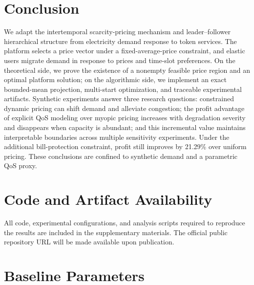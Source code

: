 \documentclass[11pt]{article}
\begin{document}
\section{Conclusion}

We adapt the intertemporal scarcity-pricing mechanism and leader--follower
hierarchical structure from electricity demand response to token services.
The platform selects a price vector under a fixed-average-price constraint,
and elastic users migrate demand in response to prices and time-slot
preferences. On the theoretical side, we prove the existence of a nonempty
feasible price region and an optimal platform solution; on the algorithmic
side, we implement an exact bounded-mean projection, multi-start
optimization, and traceable experimental artifacts. Synthetic experiments
answer three research questions: constrained dynamic pricing can shift
demand and alleviate congestion; the profit advantage of explicit QoS
modeling over myopic pricing increases with degradation severity and
disappears when capacity is abundant; and this incremental value maintains
interpretable boundaries across multiple sensitivity experiments. Under
the additional bill-protection constraint, profit still improves by 21.29\%
over uniform pricing. These conclusions are confined to synthetic demand
and a parametric QoS proxy.

\section{Code and Artifact Availability}

All code, experimental configurations, and analysis scripts required to
reproduce the results are included in the supplementary materials. The
official public repository URL will be made available upon publication.

\appendix
\section{Baseline Parameters}
\end{document}
